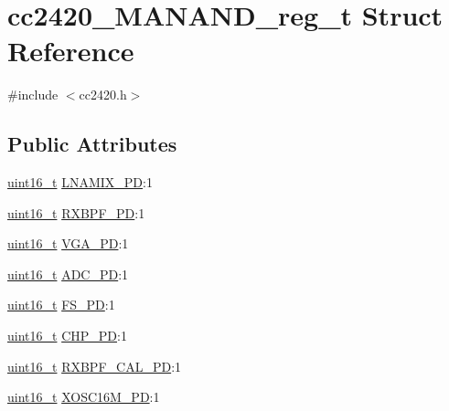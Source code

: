 \hypertarget{structcc2420___m_a_n_a_n_d__reg__t}{}\section{cc2420\+\_\+\+M\+A\+N\+A\+N\+D\+\_\+reg\+\_\+t Struct Reference}
\label{structcc2420___m_a_n_a_n_d__reg__t}


{\ttfamily \#include $<$cc2420.\+h$>$}

\subsection*{Public Attributes}
\begin{DoxyCompactItemize}
\item 
\hyperlink{_p_e___types_8h_a1f1825b69244eb3ad2c7165ddc99c956}{uint16\+\_\+t} \hyperlink{structcc2420___m_a_n_a_n_d__reg__t_af5cd752111d9fda3826bbccf19a56123}{L\+N\+A\+M\+I\+X\+\_\+\+PD}\+:1
\item 
\hyperlink{_p_e___types_8h_a1f1825b69244eb3ad2c7165ddc99c956}{uint16\+\_\+t} \hyperlink{structcc2420___m_a_n_a_n_d__reg__t_ad13de682df65231d5ab52de606d1bcf1}{R\+X\+B\+P\+F\+\_\+\+PD}\+:1
\item 
\hyperlink{_p_e___types_8h_a1f1825b69244eb3ad2c7165ddc99c956}{uint16\+\_\+t} \hyperlink{structcc2420___m_a_n_a_n_d__reg__t_a46b6adbcb2dbe8fe4a2b9c61d9a4d0c3}{V\+G\+A\+\_\+\+PD}\+:1
\item 
\hyperlink{_p_e___types_8h_a1f1825b69244eb3ad2c7165ddc99c956}{uint16\+\_\+t} \hyperlink{structcc2420___m_a_n_a_n_d__reg__t_a839b1391a0aab0dbdb9cdfc271b318c0}{A\+D\+C\+\_\+\+PD}\+:1
\item 
\hyperlink{_p_e___types_8h_a1f1825b69244eb3ad2c7165ddc99c956}{uint16\+\_\+t} \hyperlink{structcc2420___m_a_n_a_n_d__reg__t_a9d71d8b2ab027a2f07f58ce190ec76fd}{F\+S\+\_\+\+PD}\+:1
\item 
\hyperlink{_p_e___types_8h_a1f1825b69244eb3ad2c7165ddc99c956}{uint16\+\_\+t} \hyperlink{structcc2420___m_a_n_a_n_d__reg__t_abdf7b31c9b26b4b5ba67a3e492f40f8f}{C\+H\+P\+\_\+\+PD}\+:1
\item 
\hyperlink{_p_e___types_8h_a1f1825b69244eb3ad2c7165ddc99c956}{uint16\+\_\+t} \hyperlink{structcc2420___m_a_n_a_n_d__reg__t_a0d248cc816a56f71dfdc0ee1c2eeccc3}{R\+X\+B\+P\+F\+\_\+\+C\+A\+L\+\_\+\+PD}\+:1
\item 
\hyperlink{_p_e___types_8h_a1f1825b69244eb3ad2c7165ddc99c956}{uint16\+\_\+t} \hyperlink{structcc2420___m_a_n_a_n_d__reg__t_a59782ff31c795916a56bba1f4b30243f}{X\+O\+S\+C16\+M\+\_\+\+PD}\+:1

\end{DoxyCompactItemize}
